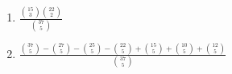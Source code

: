 \begin{enumerate}[label=(\alph*)]
\item $\frac{\binom{15}{3}\binom{22}{2}}{\binom{37}{5}}$

\item $\frac{\binom{37}{5} - \binom{27}{5} - \binom{25}{5} - \binom{22}{5} + \binom{15}{5} + \binom{10}{5} + \binom{12}{5}}{\binom{37}{5}}$
\end{enumerate}